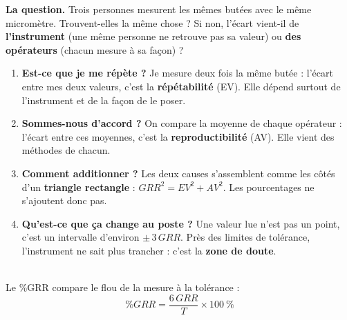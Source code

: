 \documentclass[10pt,a4paper]{article}
\begin{document}
\thispagestyle{fancy}

\begin{tcolorbox}[boite]
\textbf{La question.} Trois personnes mesurent les mêmes butées avec le même micromètre. Trouvent-elles la même chose ?
Si non, l'écart vient-il de \textbf{l'instrument} (une même personne ne retrouve pas sa valeur) ou \textbf{des opérateurs} (chacun mesure à sa façon) ?
\end{tcolorbox}

\begin{minipage}[t]{0.70\linewidth}
\begin{enumerate}[label=\textcolor{white}{\colorbox{uimm}{\textbf{\arabic*}}},leftmargin=20pt,itemsep=3pt]
\item \textbf{Est-ce que je me répète ?} Je mesure deux fois la même butée : l'écart entre mes deux valeurs, c'est la \textbf{répétabilité} (EV). Elle dépend surtout de l'instrument et de la façon de le poser.
\item \textbf{Sommes-nous d'accord ?} On compare la moyenne de chaque opérateur : l'écart entre ces moyennes, c'est la \textbf{reproductibilité} (AV). Elle vient des méthodes de chacun.
\item \textbf{Comment additionner ?} Les deux causes s'assemblent comme les côtés d'un \textbf{triangle rectangle} : $GRR^2 = EV^2 + AV^2$. Les pourcentages ne s'ajoutent donc pas.
\item \textbf{Qu'est-ce que ça change au poste ?} Une valeur lue n'est pas un point, c'est un intervalle d'environ $\pm\,3\,GRR$. Près des limites de tolérance, l'instrument ne sait plus trancher : c'est la \textbf{zone de doute}.
\end{enumerate}
\end{minipage}\hfill
\begin{minipage}[t]{0.27\linewidth}\vspace{4pt}\centering
{}\\[6pt]
{\small Le \%GRR compare le flou de la mesure à la tolérance :}
\[\%GRR=\frac{6\,GRR}{T}\times100\ \%\]
\end{minipage}
\end{document}
